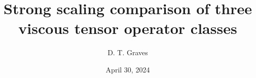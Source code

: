 \documentclass{article}
\begin{document}
\title{Strong scaling comparison of three viscous tensor operator classes}
\author{D. T. Graves   }
\date{April 30, 2024}

\maketitle






\end{document}
